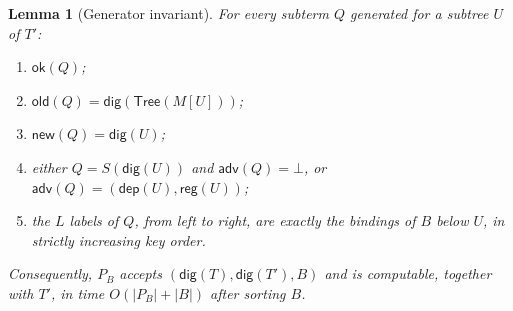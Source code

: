 \documentclass[twocolumn]{article}
\newtheorem{lemma}{Lemma}
\begin{document}
\begin{lemma}[Generator invariant]
\label{lem:generator}
For every subterm $Q$ generated for a subtree $U$ of $T'$:
\begin{enumerate}[nosep,label=(\roman*)]
  \item $\mathsf{ok}(Q)$;
  \item $\mathsf{old}(Q)=\mathsf{dig}(\mathsf{Tree}(M[U]))$;
  \item $\mathsf{new}(Q)=\mathsf{dig}(U)$;
  \item either $Q=S(\mathsf{dig}(U))$ and $\mathsf{adv}(Q)=\bot$, or $\mathsf{adv}(Q)=(\mathsf{dep}(U),\mathsf{reg}(U))$;
  \item the $L$ labels of $Q$, from left to right, are exactly the bindings of $B$ below $U$, in strictly increasing key order.
\end{enumerate}
Consequently, $P_B$ accepts $(\mathsf{dig}(T),\mathsf{dig}(T'),B)$ and is computable, together with $T'$, in time $O(|P_B|+|B|)$ after sorting $B$.
\end{lemma}
\end{document}

